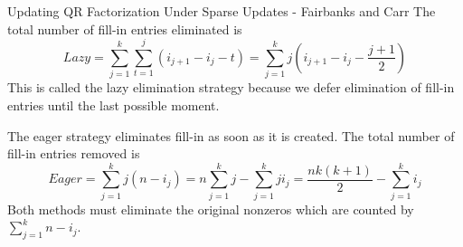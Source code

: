 \documentclass{beamer}
\begin{document}



\begin{frame}{Updating QR Factorization Under Sparse Updates - Fairbanks and Carr} The total number of fill-in entries eliminated is 
\[ Lazy = \sum_{j=1}^k \sum_{t=1}^j (i_{j+1} - i_{j} - t) = \sum_{j=1}^k j(i_{j+1}-i_{j} - \frac{j+1}{2})
\]
This is called the lazy elimination strategy because we defer elimination of fill-in entries until the last possible moment.

The eager strategy eliminates fill-in as soon as it is created. 
The total number of fill-in entries removed is
\[ Eager = \sum_{j=1}^k j(n - i_{j}) = n\sum_{j=1}^k j - \sum_{j=1}^k ji_j = \frac{nk(k+1)}{2} - \sum_{j=1}^k i_j
\]
Both methods must eliminate the original nonzeros which are counted by $\sum_{j=1}^k n-i_j $. 

\end{frame}

\end{document}
